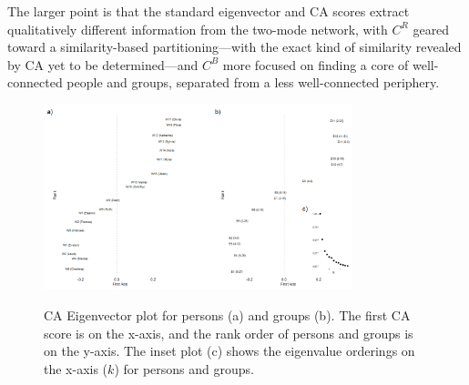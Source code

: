 \documentclass[a4paper,fleqn]{cas-sc}
\begin{document}
The larger point is that the standard eigenvector and CA scores extract qualitatively different information from the two-mode network, with $C^R$ geared toward a similarity-based partitioning---with the exact kind of similarity revealed by CA yet to be determined---and $C^B$ more focused on finding a core of well-connected people and groups, separated from a less well-connected periphery. 

\begin{figure}[ht!]
    \centering
        \includegraphics[width=0.8\textwidth]{Plots/ca-eigvec.png}            
        \label{fig:eigvec}
    \caption{CA Eigenvector plot for persons (a) and groups (b). The first CA score is on the x-axis, and the rank order of persons and groups is on the y-axis. The inset plot (c) shows the eigenvalue orderings on the x-axis ($k$) for persons and groups.}
    \label{fig:ca-eigvec}
\end{figure}
\end{document}

